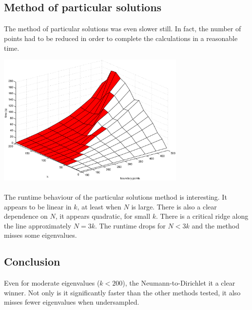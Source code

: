 \documentclass{article}
\begin{document}
\subsection{Method of particular solutions}
\paragraph{}
The method of particular solutions was even slower still.
In fact, the number of points had to be reduced in order to complete the calculations in a reasonable time. \\
\begin{center}
\includegraphics[width=0.7\textwidth]{ms.eps} \\
\end{center}
\paragraph{}
The runtime behaviour of the particular solutions method is interesting.
It appears to be linear in $k$, at least when $N$ is large.
There is also a clear dependence on $N$, it appears quadratic, for small $k$.
There is a critical ridge along the line approximately $N = 3 k$.
The runtime drops for $N < 3k$ and the method misses some eigenvalues.
\subsection{Conclusion}
\paragraph{}
Even for moderate eigenvalues ($k < 200$), the Neumann-to-Dirichlet it a clear winner.
Not only is it significantly faster than the other methods tested, it also misses fewer eigenvalues when undersampled.
\end{document}
